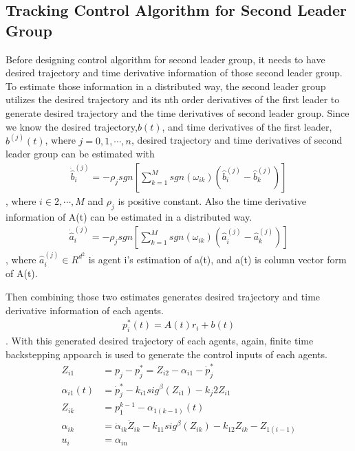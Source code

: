 \subsection*{Tracking Control Algorithm for Second Leader Group} \label{Tracking_Control_Algorithm_Second_Leader_Group}
 Before designing control algorithm for second leader group, it needs to have desired trajectory and time derivative information of those second leader group. To estimate those information in a distributed way, the second leader group utilizes the desired trajectory and its nth order derivatives of the first leader to generate desired trajectory and the time derivatives of second leader group. Since we know the desired trajectory,$b(t)$, and time derivatives of the first leader,$b^{(j)}(t)$, where $j = 0,1, \cdots, n$, desired trajectory and time derivatives of second leader group can be estimated with
 \begin{align*}
    \dot {\hat b}_i^{(j)} = -\rho_j sgn[\sum_{k=1}^{M} sgn(\omega_{ik})(\hat b_i^{(j)} - \hat b_k^{(j)})]
 \end{align*}, where $i \in {2, \cdots, M}$ and $\rho_j$ is positive constant.
Also the time derivative information of A(t) can be estimated in a distributed way.
\begin{align*}
    \dot {\hat a}_i^{(j)} = -\rho_j sgn[\sum_{k=1}^{M} sgn(\omega_{ik})(\hat a_i^{(j)} - \hat a_k^{(j)})]
 \end{align*}, where $\hat a_i^{(j)} \in R^{d^2}$ is agent i's estimation of a(t), and a(t) is column vector form of A(t). 

 Then combining those two estimates generates desired trajectory and time derivative information of each agents. 
 \begin{align*}
    p_i^* (t) = A(t) r_i + b(t)
 \end{align*}. With this generated desired trajectory of each agents, again, finite time backstepping appoarch is used to generate the control inputs of each agents. 
 \begin{align*}
    Z_{i1} &= p_j - p_j^* = Z_{i2} - \alpha_{i1} - \dot p_j^*\\
    \alpha_{i1} (t) &= \dot p_j^{*} - k_{i1} sig ^{\beta}(Z_{i1}) - k_j2 Z_{i1}\\
    Z_{ik} &= p_1^{k-1} - \alpha_{1(k-1)} (t)\\
    \alpha_{ik} &=  \dot \alpha_{ik} \dot Z_{ik} - k_{11} sig^{\beta}(Z_{ik}) - k_{12} Z_{ik} - Z_{1(i-1)} \\
    u_i &= \alpha_{in}
\end{align*} 
